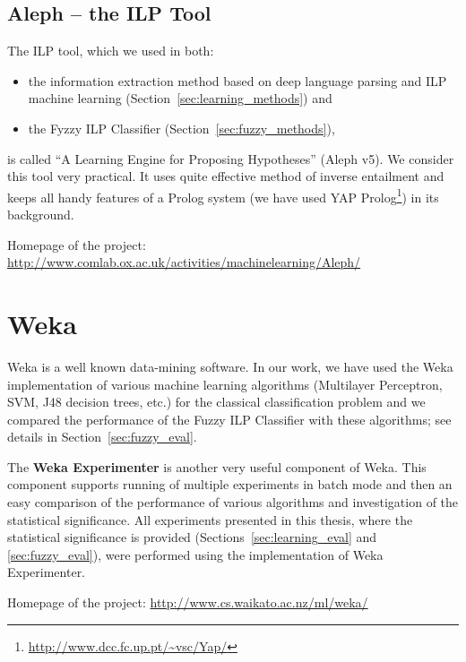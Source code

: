 \subsection{Aleph -- the ILP Tool} \label{sec:third_ILP_tool}
The ILP tool, which we used in both:
\begin{itemize}
	\item the information extraction method based on deep language parsing and ILP machine learning (Section~\ref{sec:learning_methods}) and
	\item the Fyzzy ILP Classifier (Section~\ref{sec:fuzzy_methods}),
\end{itemize}
is called ``A Learning Engine for Proposing Hypotheses'' (Aleph v5). %
We consider this tool very practical. It uses quite effective method of inverse entailment \citep{biblio:InverseEntailment} and keeps all handy features of a Prolog system (we have used YAP Prolog\footnote{\url{http://www.dcc.fc.up.pt/~vsc/Yap/}}) in its background.



\medskip
Homepage of the project: \\
\phantom{a} \hfill{} \phantom{b} \url{http://www.comlab.ox.ac.uk/activities/machinelearning/Aleph/}










\section{Weka} \label{sec:third_weka}

Weka \citep{biblio:Weka} is a well known data-mining software. In our work, we have used the Weka implementation of various machine learning algorithms (Multilayer Perceptron, SVM, J48 decision trees, etc.) for the classical classification problem and we compared the performance of the Fuzzy ILP Classifier with these algorithms; see details in Section~\ref{sec:fuzzy_eval}.

The \textbf{Weka Experimenter} is another very useful component of Weka. This component supports running of multiple experiments in batch mode and then an easy comparison of the performance of various algorithms and investigation of the statistical significance. All experiments presented in this thesis, where the statistical significance is provided (Sections~\ref{sec:learning_eval} and \ref{sec:fuzzy_eval}), were performed using the implementation of Weka Experimenter.


\medskip
Homepage of the project: \url{http://www.cs.waikato.ac.nz/ml/weka/}

